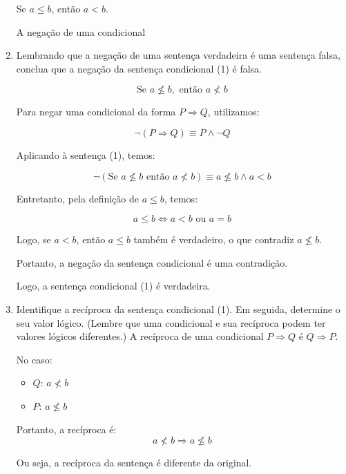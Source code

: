 \documentclass[12pt,a4paper]{article}
\begin{document}
\begin{enumerate}[label= (\alph*)]
        Se \( a \leq b \), então \( a < b \).


        A negação de uma condicional

        \item Lembrando que a negação de uma sentença verdadeira é uma sentença falsa, conclua que a negação
        da sentença condicional (1) é falsa.

        \[
        \text{Se } a \not\leq b, \text{ então } a \not< b
        \]
        
        Para negar uma condicional da forma \( P \Rightarrow Q \), utilizamos:
        
        \[
        \neg(P \Rightarrow Q) \equiv P \land \neg Q
        \]
        
        Aplicando à sentença (1), temos:
        
        \[
        \neg(\text{Se } a \not\leq b \text{ então } a \not< b) \equiv a \not\leq b \land a < b
        \]
        
        Entretanto, pela definição de \( a \leq b \), temos:
        
        \[
        a \leq b \iff a < b \text{ ou } a = b
        \]
        
        Logo, se \( a < b \), então \( a \leq b \) também é verdadeiro, o que contradiz \( a \not\leq b \).
        
        Portanto, a negação da sentença condicional é uma contradição.
        
        Logo, a sentença condicional (1) é verdadeira.

        \item Identifique a recíproca da sentença condicional (1). Em seguida, determine o seu valor lógico.
        (Lembre que uma condicional e sua recíproca podem ter valores lógicos diferentes.)
        A recíproca de uma condicional \( P \Rightarrow Q \) é \( Q \Rightarrow P \).

        No caso:
        \begin{itemize}
            \item \( Q \): \( a \nless b \)
            \item \( P \): \( a \nleq b \)
        \end{itemize}
        
        Portanto, a recíproca é:
        \[
        a \nless b \Rightarrow a \nleq b
        \]
        
        Ou seja, a recíproca da sentença é diferente da original.
        

\end{enumerate}
\end{document}
